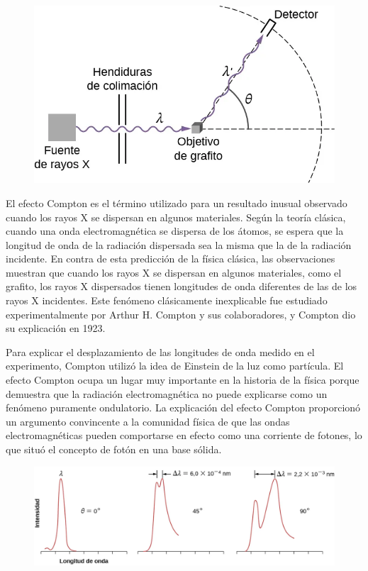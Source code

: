 \documentclass[letterpaper, 12pt]{article}
\begin{document}
\subsection{\cite{Moebs_2021}}

\begin{figure}
      \begin{center}
            \includegraphics[width=.3\textwidth]{Images/Imagen_2.png}
      \end{center}
\end{figure}

El efecto Compton es el término utilizado para un resultado
inusual observado cuando los rayos X se dispersan en
algunos materiales. Según la teoría clásica, cuando una
onda electromagnética se dispersa de los átomos, se espera
que la longitud de onda de la radiación dispersada sea la
misma que la de la radiación incidente. En contra de esta
predicción de la física clásica, las observaciones muestran
que cuando los rayos X se dispersan en algunos materiales,
como el grafito, los rayos X dispersados tienen longitudes
de onda diferentes de las de los rayos X incidentes. Este
fenómeno clásicamente inexplicable fue estudiado
experimentalmente por Arthur H. Compton y sus
colaboradores, y Compton dio su explicación en 1923.

Para explicar el desplazamiento de las longitudes de onda
medido en el experimento, Compton utilizó la idea de
Einstein de la luz como partícula. El efecto Compton ocupa
un lugar muy importante en la historia de la física porque
demuestra que la radiación electromagnética no puede
explicarse como un fenómeno puramente ondulatorio. La
explicación del efecto Compton proporcionó un argumento
convincente a la comunidad física de que las ondas
electromagnéticas pueden comportarse en efecto como una
corriente de fotones, lo que situó el concepto de fotón en
una base sólida.

\begin{figure}[H]
      \begin{center}
            \includegraphics[width=.7\linewidth]{Images/Imagen_3.png}
            \caption{}
      \end{center}
\end{figure}
\end{document}
